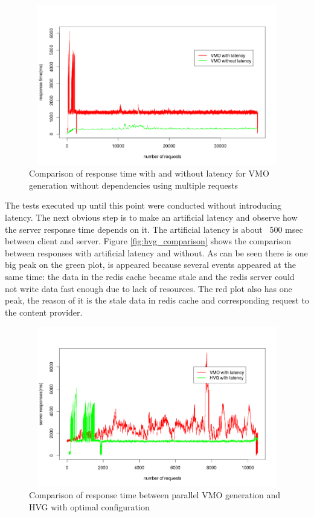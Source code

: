 \begin{figure}[h!]
    \centering
    \includegraphics[width=15cm,height=7cm,keepaspectratio]{images/vmo_parallel_comparison.png}
    \caption{Comparison of response time with and without latency for VMO generation without dependencies using multiple requests}
    \label{fig:vmo_comparison}
\end{figure}

The tests executed up until this point were conducted without introducing latency. The next obvious step is to make an artificial latency and observe how the server response time depends on it. The artificial latency is about ~500 msec between client and server. Figure \ref{fig:hvg_comparison} shows the comparison between responses with artificial latency and without. As can be seen there is one big peak on the green plot, is appeared because several events appeared at the same time: the data in the redis cache became stale and the redis server could not write data fast enough due to lack of resources. The red plot also has one peak, the reason of it is the stale data in redis cache and corresponding request to the content provider.

\begin{figure}[h!]
    \centering
    \includegraphics[width=15cm,height=7cm,keepaspectratio]{images/hvg_vmo_latency_comparison.png}
    \caption{Comparison of response time between parallel VMO generation and HVG with optimal configuration}
    \label{fig:hvg_vmo_latency_comp}
\end{figure}


